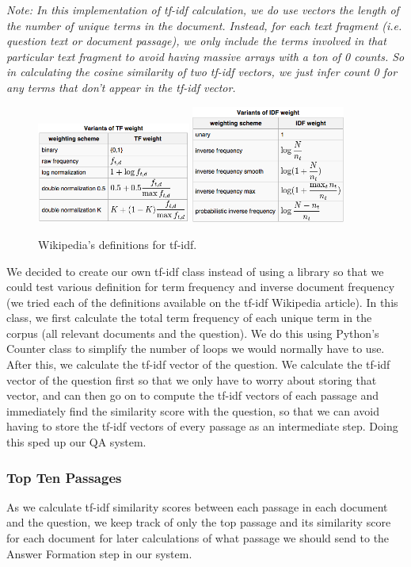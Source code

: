 \documentclass{article}
\begin{document}
\textit{Note: In this implementation of tf-idf calculation, we do use vectors the length of the number of unique terms in the document. Instead, for each text fragment (i.e. question text or document passage), we only include the terms involved in that particular text fragment to avoid having massive arrays with a ton of 0 counts. So in calculating the cosine similarity of two tf-idf vectors, we just infer count 0 for any terms that don't appear in the tf-idf vector.}
\begin{figure}[h]
    \centering
    \includegraphics[width=0.45\textwidth]{images/tf.png}
    \includegraphics[width=0.45\textwidth]{images/idf.png}
    \caption{Wikipedia's definitions for tf-idf.}
\end{figure}
We decided to create our own tf-idf class instead of using a library so that we could test various definition for term frequency and inverse document frequency (we tried each of the definitions available on the tf-idf Wikipedia article). In this class, we first calculate the total term frequency of each unique term in the corpus (all relevant documents and the question). We do this using Python's Counter class to simplify the number of loops we would normally have to use. After this, we calculate the tf-idf vector of the question. We calculate the tf-idf vector of the question first so that we only have to worry about storing that vector, and can then go on to compute the tf-idf vectors of each passage and immediately find the similarity score with the question, so that we can avoid having to store the tf-idf vectors of every passage as an intermediate step. Doing this sped up our QA system.

\subsubsection{Top Ten Passages}
As we calculate tf-idf similarity scores between each passage in each document and the question, we keep track of only the top passage and its similarity score for each document for later calculations of what passage we should send to the Answer Formation step in our system.
\end{document}
